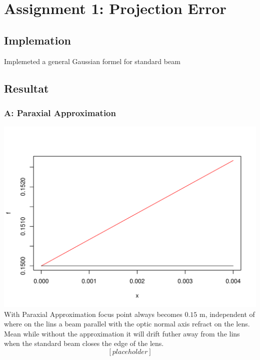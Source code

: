 \documentclass[12pt]{article}
\begin{document}
\section{Assignment 1: Projection Error}

\subsection{Implemation}
Implemeted a general Gaussian formel for standard beam 

\subsection{Resultat}

\subsubsection{A: Paraxial Approximation}
\includegraphics[scale=0.6]{para_approx.pdf}
With Paraxial Approximation focus point always becomes $0.15$ m, independent 
of where on the lins a beam parallel with the optic normal axis refract on the lens.
Mean while without the approximation it will drift futher away from the lins 
when the standard beam closes the edge of the lens.
 $$[placeholder]$$
\end{document}
